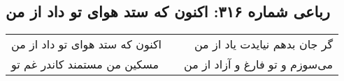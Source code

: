 \begin{center}
\section*{رباعی شماره ۳۱۶: اکنون که ستد هوای تو داد از من}
\label{sec:sh316}
\begin{longtable}{l p{0.5cm} r}
اکنون که ستد هوای تو داد از من
&&
گر جان بدهم نیایدت یاد از من
\\
مسکین من مستمند کاندر غم تو
&&
می‌سوزم و تو فارغ و آزاد از من
\\
\end{longtable}
\end{center}
